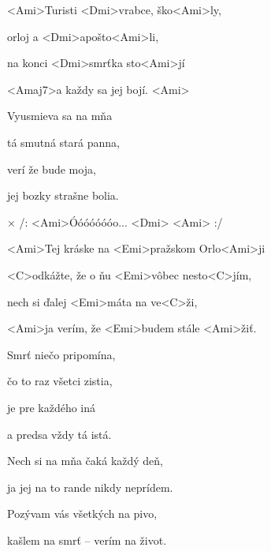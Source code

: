 
\zs
<Ami>Turisti <Dmi>vrabce, ško<Ami>ly,

orloj a <Dmi>apošto<Ami>li,

na konci <Dmi>smrťka sto<Ami>jí

<Amaj7>a každy sa jej bojí. <Ami>
\ks

\zs
Vyusmieva sa na mňa

tá smutná stará panna,

verí že bude moja,

jej bozky strašne bolia.
\ks

× /: <Ami>Óóóóóóóo... <Dmi> <Ami> :/

<Ami>Tej kráske na <Emi>pražskom Orlo<Ami>ji

<C>odkážte, že o ňu <Emi>vôbec nesto<C>jím,

nech si ďalej <Emi>máta na ve<C>ži,

<Ami>ja verím, že <Emi>budem stále <Ami>žiť.
\kr

\zs
Smrť niečo pripomína,

čo to raz všetci zistia,

je pre každého iná

a predsa vždy tá istá.
\ks

\zr \kr

\zr
Nech si na mňa čaká každý deň,

ja jej na to rande nikdy neprídem.

Pozývam vás všetkých na pivo,

kašlem na smrť -- verím na život.
\kr

\kp
